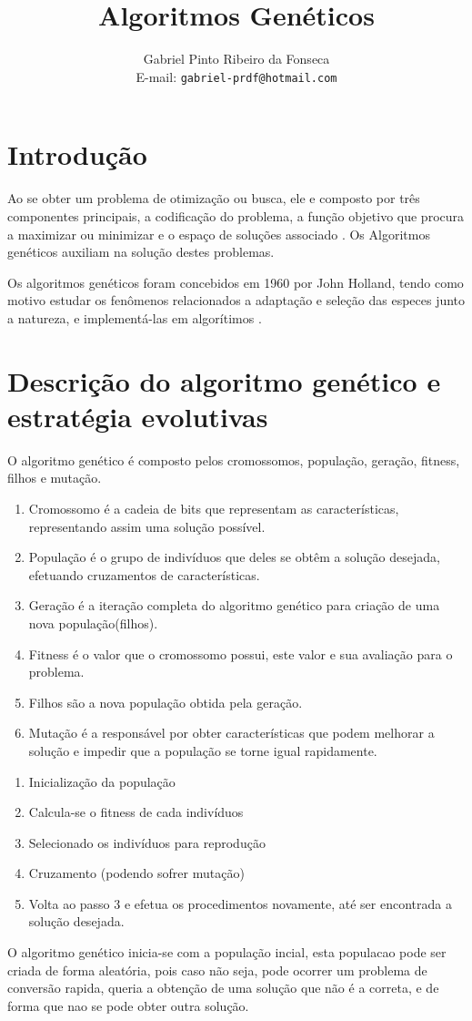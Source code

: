 \documentclass[a4paper,11pt]{article}
\title{Algoritmos Genéticos}
\author{Gabriel Pinto Ribeiro da Fonseca\\E-mail: {\tt gabriel-prdf@hotmail.com}}
\date{}
\begin{document}
\maketitle


\begin{multicols}{2}
\section{Introdução}
Ao se obter um problema de otimização ou busca, ele e composto por três componentes principais, a codificação do problema, a função objetivo que procura a maximizar ou minimizar e o espaço de soluções associado \cite{ref:marcio2009b}.
 Os Algoritmos genéticos auxiliam na solução destes problemas.
 
 Os algoritmos genéticos foram concebidos em 1960 por John Holland, tendo como motivo estudar os fenômenos relacionados a adaptação e seleção das especes junto a natureza, e implementá-las em algorítimos \cite{ref:aurora2004b}.

\section{Descrição do algoritmo genético e estratégia evolutivas}
O algoritmo genético é composto pelos cromossomos, população, geração, fitness, filhos e mutação.
\begin{enumerate}
\item Cromossomo é a cadeia de bits que representam as características, representando assim uma solução possível.
\item População é o grupo de indivíduos que deles se obtêm a solução desejada, efetuando cruzamentos de características.
\item Geração é a iteração completa do algoritmo genético para criação de uma nova população(filhos).
\item Fitness é o valor que o cromossomo possui, este valor e sua avaliação para o problema.
\item Filhos são a nova população obtida pela geração.
\item Mutação é a responsável por obter características que podem melhorar a solução e impedir que a população se torne igual rapidamente.
\end{enumerate}

\begin{enumerate}
\item Inicialização da população
\item Calcula-se o fitness de cada indivíduos
\item Selecionado os indivíduos para reprodução
\item Cruzamento (podendo sofrer mutação)
\item Volta ao passo 3 e efetua os procedimentos novamente, até ser encontrada a solução desejada.
\end{enumerate}
O algoritmo genético inicia-se com a população incial, esta populacao pode ser criada de forma aleatória, pois caso não seja, pode ocorrer um problema de conversão rapida, queria a obtenção de uma solução que não é a correta, e de forma que nao se pode obter outra solução.


\end{multicols}
\end{document}
